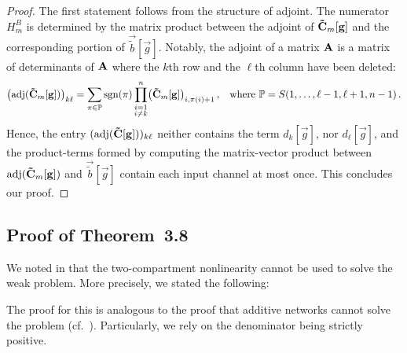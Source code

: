\begin{proof}
The first statement follows from the structure of adjoint.
The numerator $H_m^B$ is determined by the matrix product between the adjoint of $\mathbf{\tilde C}_m[\mathbf{g}]$ and the corresponding portion of $\vec{\tilde b}[\vec g]$.
Notably, the adjoint of a matrix $\mathbf{A}$ is a matrix of determinants of $\mathbf{A}$ where the $k$th row and the $\ell$th column have been deleted:
\begin{align*}
	\bigl(\operatorname{\mathrm{adj}}(\mathbf{\tilde C}_m[\mathbf{g}])\bigr)_{k\ell}
		&= \sum_{\pi \in \mathbb{P}} \operatorname{\mathrm{sgn}}(\pi) \prod_{\substack{i=1\\i \neq k}}^n \bigl( \mathbf{\tilde C}_m[\mathbf{g}] \bigr)_{i, \pi(i) + 1} \,,
	& \text{where } \mathbb{P} = S({1, \ldots, \ell - 1, \ell + 1, n - 1}) \,.
\end{align*}
Hence, the entry $(\operatorname{\mathrm{adj}}(\mathbf{\tilde C}[\mathbf{g}]))_{k\ell}$ neither contains the term $d_{k}[\vec g]$, nor $d_{\ell}[\vec g]$, and the product-terms formed by computing the matrix-vector product between $\operatorname{\mathrm{adj}}(\mathbf{\tilde C}_m[\mathbf{g}])$ and $\vec{\tilde b}[\vec g]$ contain each input channel at most once.
This concludes our proof.
\end{proof}

\subsection{Proof of Theorem~3.8}
\label{app:thm_two_comp_xor}

We noted in  that the two-compartment \LIF nonlinearity cannot be used to solve the weak \XOR problem.
More precisely, we stated the following:

\ThmTwoCompXor*

The proof for this is analogous to the proof that additive networks cannot solve the \XOR problem (cf.~).
Particularly, we rely on the denominator being strictly positive.

